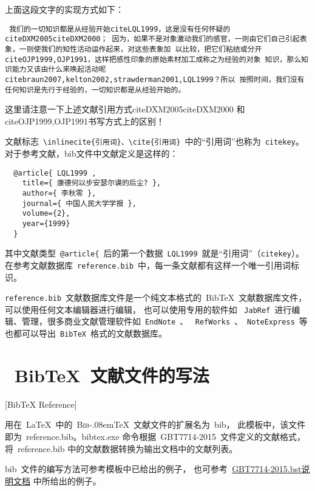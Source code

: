 上面这段文字的实现方式如下：

\texttt{
  我们的一切知识都是从经验开始\cs cite{LQL1999}，这是没有任何怀疑的\cs cite{DXM2005}\cs cite{DXM2000}；
  因为，如果不是对象激动我们的感官，一则由它们自己引起表象，一则使我们的知性活动运作起来，对这些表象加
  以比较，把它们粘结或分开\cs cite{OJP1999,OJP1991}，这样把感性印象的原始素材加工成称之为经验的对象
  知识，那么知识能力又该由什么来唤起活动呢\cs cite{braun2007,kelton2002,strawderman2001,LQL1999}？所以
  按照时间，我们没有任何知识是先行于经验的，一切知识都是从经验开始的。
}

这里请注意一下上述文献引用方式\cite{DXM2005}\cite{DXM2000}\cs cite{DXM2005}\cs cite{DXM2000}
和\cite{OJP1999,OJP1991}\cs cite{OJP1999,OJP1991}书写方式上的区别！

文献标志~\verb|\inlinecite{引用词}、\cite{引用词}|~中的“引用词”也称为~\verb|citekey|。
对于参考文献\cite{OJP1999}，bib文件中文献定义是这样的：
\begin{lstlisting}
  @article{ LQL1999 ,
    title={ 康德何以步安瑟尔谟的后尘? },
    author={ 李秋零 },
    journal={ 中国人民大学学报 },
    volume={2},
    year={1999}
  }
\end{lstlisting}

其中文献类型~\verb|@article{|~后的第一个数据~\verb|LQL1999|~就是“引用词”（\verb|citekey|）。
在参考文献数据库~\texttt{reference.bib}~中，每一条文献都有这样一个唯一引用词标识。

\texttt{reference.bib}~文献数据库文件是一个纯文本格式的~BibTeX~文献数据库文件，可以使用任何文本编辑器进行编辑，
也可以使用专用的软件如 ~\texttt{JabRef}~进行编辑、管理，很多商业文献管理软件如~\texttt{EndNote}~、
~\texttt{RefWorks}~、~\texttt{NoteExpress}~等也都可以导出~\texttt{BibTeX}~格式的文献数据库。

\section{~BibTeX~文献文件的写法}[BibTeX Reference]

用在~\LaTeX~中的~\textsc{Bib}\kern-.08em\TeX~文献文件的扩展名为~bib，
此模板中，该文件即为~reference.bib。bibtex.exe 命令根据~GBT7714-2015~文件定义的文献格式，
将~reference.bib 中的文献数据转换为输出文档中的文献列表。

bib~文件的编写方法可参考模板中已给出的例子，
也可参考~\href{http://bbs.ctex.org/attachment.php?aid=MTk3OTd8NjY1ODc5OGV8MTMyNTY0MTEyMnxhZGZkYWpsa0I2RGZwNDR5Z1lyeStjb1dKRS8rTnJub3lvT2FkNDNJbHl1UWVkVQ\%3D\%3D}{GBT7714-2015.bst说明文档} 中所给出的例子。


